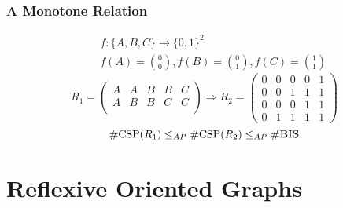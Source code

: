 \documentclass[a4paper,handout]{beamer}
\newcommand{\ccsp}{\#CSP}
\newcommand{\cbis}{\#\textsc{BIS}}
\newcommand{\aple}{\le_{AP}}
\theoremstyle{definition}
\begin{document}
\begin{frame}
\frametitle{A Monotone Relation}
\begin{example}
\begin{center}
\end{center}
\pause
\begin{eqnarray*}
&&f : \{A,B,C\} \to \{0,1\}^2\\
&&f(A) = \binom 00, f(B) = \binom 01, f(C) = \binom 11
\end{eqnarray*}
\pause
\vspace{-12pt}
\[R_1 = \begin{pmatrix}
A & A & B & B & C\\
A & B & B & C & C\\
\end{pmatrix} 
\Rightarrow
R_2 = \begin{pmatrix}
0 & 0 & 0 & 0 & 1 \\
0 & 0 & 1 & 1 & 1 \\
0 & 0 & 0 & 1 & 1 \\
0 & 1 & 1 & 1 & 1
\end{pmatrix} \]
\pause
\[\mathrm{\ccsp(}R_1\mathrm{)}\aple\mathrm{\ccsp(}R_2\mathrm{)}\aple\mathrm{\cbis}\]
\end{example}
\end{frame}

\section{Reflexive Oriented Graphs}
\end{document}
